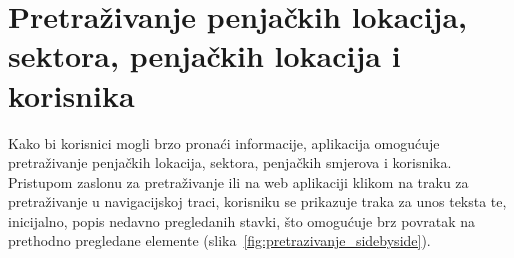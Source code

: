 \section{Pretraživanje penjačkih lokacija, sektora, penjačkih lokacija i korisnika}

Kako bi korisnici mogli brzo pronaći informacije, aplikacija omogućuje pretraživanje penjačkih lokacija, sektora, penjačkih smjerova i korisnika. Pristupom zaslonu za pretraživanje ili na web aplikaciji klikom na traku za pretraživanje u navigacijskoj traci, korisniku se prikazuje traka za unos teksta te, inicijalno, popis nedavno pregledanih stavki, što omogućuje brz povratak na prethodno pregledane elemente (slika~\ref{fig:pretrazivanje_sidebyside}).

\begin{figure}[H]
    \centering
    \begin{subfigure}[b]{0.35\textwidth}
        \centering

\end{subfigure}
\end{figure}
